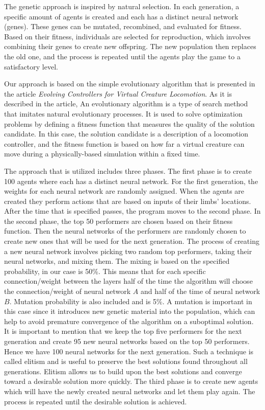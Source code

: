 \documentclass[letterpaper]{article} %
\begin{document}
The genetic approach is inspired by natural selection. In each generation, a specific amount of agents is created and each has a distinct neural network (genes). These genes can be mutated, recombined, and evaluated for fitness. Based on their fitness, individuals are selected for reproduction, which involves combining their genes to create new offspring. The new population then replaces the old one, and the process is repeated until the agents play the game to a satisfactory level.

\par Our approach is based on the simple evolutionary algorithm that is presented in the article \textit{Evolving Controllers for Virtual Creature Locomotion}. As it is described in the article, An evolutionary algorithm is a type of search method that imitates natural evolutionary processes. It is used to solve optimization problems by defining a fitness function that measures the quality of the solution candidate. In this case, the solution candidate is a description of a locomotion controller, and the fitness function is based on how far a virtual creature can move during a physically-based simulation within a fixed time.

\par The approach that is utilized includes three phases. The first phase is to create 100 agents where each has a distinct neural network. For the first generation, the weights for each neural network are randomly assigned. When the agents are created they perform actions that are based on inputs of their limbs' locations. After the time that is specified passes, the program moves to the second phase. In the second phase, the top 50 performers are chosen based on their fitness function. Then the neural networks of the performers are randomly chosen to create new ones that will be used for the next generation. The process of creating a new neural network involves picking two random top performers, taking their neural networks, and mixing them. The mixing is based on the specified probability, in our case is 50\%. This means that for each specific connection/weight between the layers half of the time the algorithm will choose the connection/weight of neural network $A$ and half of the time of neural network $B$. Mutation probability is also included and is 5\%. A mutation is important in this case since it introduces new genetic material into the population, which can help to avoid premature convergence of the algorithm on a suboptimal solution. It is important to mention that we keep the top five performers for the next generation and create 95 new neural networks based on the top 50 performers. Hence we have 100 neural networks for the next generation. Such a technique is called elitism and is useful to preserve the best solutions found throughout all generations. Elitism allows us to build upon the best solutions and converge toward a desirable solution more quickly. The third phase is to create new agents which will have the newly created neural networks and let them play again. The process is repeated until the desirable solution is achieved.
\end{document}
